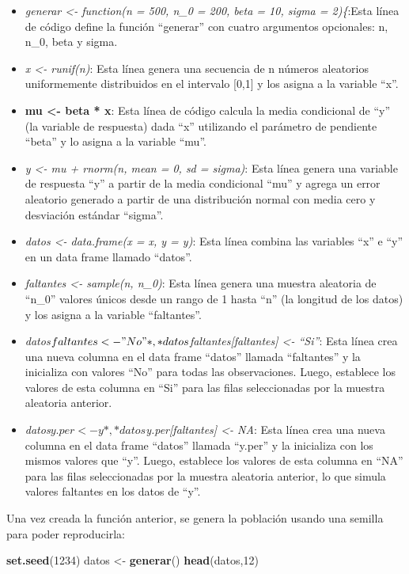 \documentclass[
  spanish,
  12pt,
]{book}
\newenvironment{Shaded}{\begin{snugshade}}{\end{snugshade}}
\newcommand{\DecValTok}[1]{\textcolor[rgb]{0.00,0.00,0.81}{#1}}
\newcommand{\FunctionTok}[1]{\textcolor[rgb]{0.13,0.29,0.53}{\textbf{#1}}}
\newcommand{\NormalTok}[1]{#1}
\newcommand{\OtherTok}[1]{\textcolor[rgb]{0.56,0.35,0.01}{#1}}
\begin{document}
\begin{itemize}
\item
  \emph{generar \textless- function(n = 500, n\_0 = 200, beta = 10, sigma = 2)\{}:Esta línea de código define la función ``generar'' con cuatro argumentos opcionales: n, n\_0, beta y sigma.
\item
  \emph{x \textless- runif(n)}: Esta línea genera una secuencia de n números aleatorios uniformemente distribuidos en el intervalo {[}0,1{]} y los asigna a la variable ``x''.
\item
  \textbf{mu \textless- beta * x}: Esta línea de código calcula la media condicional de ``y'' (la variable de respuesta) dada ``x'' utilizando el parámetro de pendiente ``beta'' y lo asigna a la variable ``mu''.
\item
  \emph{y \textless- mu + rnorm(n, mean = 0, sd = sigma)}: Esta línea genera una variable de respuesta ``y'' a partir de la media condicional ``mu'' y agrega un error aleatorio generado a partir de una distribución normal con media cero y desviación estándar ``sigma''.
\item
  \emph{datos \textless- data.frame(x = x, y = y)}: Esta línea combina las variables ``x'' e ``y'' en un data frame llamado ``datos''.
\item
  \emph{faltantes \textless- sample(n, n\_0)}: Esta línea genera una muestra aleatoria de ``n\_0'' valores únicos desde un rango de 1 hasta ``n'' (la longitud de los datos) y los asigna a la variable ``faltantes''.
\item
  \emph{datos\(faltantes <- "No"*, *datos\)faltantes{[}faltantes{]} \textless- ``Si''}: Esta línea crea una nueva columna en el data frame ``datos'' llamada ``faltantes'' y la inicializa con valores ``No'' para todas las observaciones. Luego, establece los valores de esta columna en ``Si'' para las filas seleccionadas por la muestra aleatoria anterior.
\item
  \emph{datos\(y.per <- y*, *datos\)y.per{[}faltantes{]} \textless- NA}: Esta línea crea una nueva columna en el data frame ``datos'' llamada ``y.per'' y la inicializa con los mismos valores que ``y''. Luego, establece los valores de esta columna en ``NA'' para las filas seleccionadas por la muestra aleatoria anterior, lo que simula valores faltantes en los datos de ``y''.
\end{itemize}

Una vez creada la función anterior, se genera la población usando una semilla para poder reproducirla:

\begin{Shaded}
\begin{Highlighting}[]
\FunctionTok{set.seed}\NormalTok{(}\DecValTok{1234}\NormalTok{)}
\NormalTok{datos }\OtherTok{\textless{}{-}} \FunctionTok{generar}\NormalTok{()}
\FunctionTok{head}\NormalTok{(datos,}\DecValTok{12}\NormalTok{)}
\end{Highlighting}
\end{Shaded}
\end{document}
